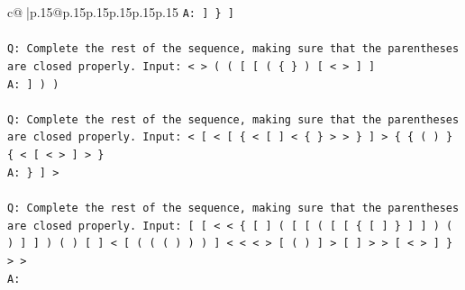 \documentclass{article}
\begin{document}
{\begin{supertabular}{c@{$\;$}|p{.15\linewidth}@{}p{.15\linewidth}p{.15\linewidth}p{.15\linewidth}p{.15\linewidth}p{.15\linewidth}}
{{{\texttt{A: {]} \} {]}} \\
\\ 
\texttt{Q: Complete the rest of the sequence, making sure that the parentheses are closed properly. Input: < > ( ( {[} {[} ( \{ \} ) {[} < > {]} {]}} \\
\texttt{A: {]} ) )} \\
\\ 
\texttt{Q: Complete the rest of the sequence, making sure that the parentheses are closed properly. Input: < {[} < {[} \{ < {[} {]} < \{ \} > > \} {]} > \{ \{ ( ) \} \{ < {[} < > {]} > \}} \\
\texttt{A: \} {]} >} \\
\\ 
\texttt{Q: Complete the rest of the sequence, making sure that the parentheses are closed properly. Input: {[} {[} < < \{ {[} {]} ( {[} {[} ( {[} {[} \{ {[} {]} \} {]} {]} ) ( ) {]} {]} ) ( ) {[} {]} < {[} ( ( ( ) ) ) {]} < < < > {[} ( ) {]} > {[} {]} > > {[} < > {]} \} > >} \\
\texttt{A:} \\
            }
        }
    }
     \\ \\


\end{supertabular}}
\end{document}
